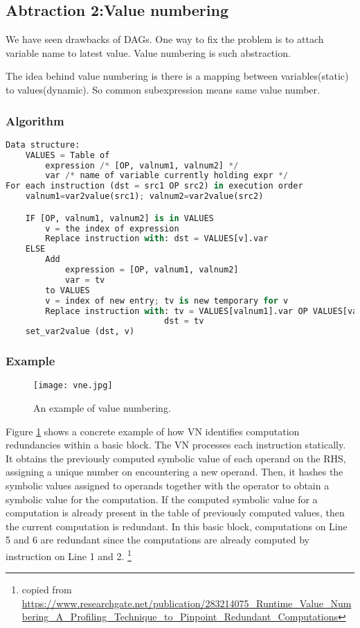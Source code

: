\subsection{Abtraction 2:Value numbering} 

We have seen drawbacks of DAGs. One way to fix the problem is to attach variable name to latest value. Value numbering is 
such abstraction.

The idea behind value numbering is there is a mapping between variables(static) to values(dynamic). So common subexpression means same 
value number.

\subsubsection{Algorithm}


\begin{lstlisting}[language=python, frame=single,caption=code ,label=lst:vna]
Data structure:
    VALUES = Table of
        expression /* [OP, valnum1, valnum2] */
        var /* name of variable currently holding expr */
For each instruction (dst = src1 OP src2) in execution order
    valnum1=var2value(src1); valnum2=var2value(src2)

    IF [OP, valnum1, valnum2] is in VALUES
        v = the index of expression
        Replace instruction with: dst = VALUES[v].var
    ELSE
        Add
            expression = [OP, valnum1, valnum2]
            var = tv
        to VALUES
        v = index of new entry; tv is new temporary for v
        Replace instruction with: tv = VALUES[valnum1].var OP VALUES[valnum2].var
                                dst = tv
    set_var2value (dst, v)  
\end{lstlisting}


\subsubsection{Example}


\begin{figure}[h]
    \centering
    \texttt{[image: vne.jpg]}
    \caption{An example of value numbering.}
    \label{fig:vne}
\end{figure}

Figure \ref{fig:vne} shows a concrete example of how VN identifies
computation redundancies within a basic block. The VN
processes each instruction statically. It obtains the previously
computed symbolic value of each operand on the RHS, assigning a unique number on encountering a new operand. Then, it
hashes the symbolic values assigned to operands together with
the operator to obtain a symbolic value for the computation.
If the computed symbolic value for a computation is already
present in the table of previously computed values, then the
current computation is redundant. In this basic block, computations on Line 5 and 6 are redundant since the computations
are already computed by instruction on Line 1 and 2. \footnote{copied from \url{https://www.researchgate.net/publication/283214075_Runtime_Value_Numbering_A_Profiling_Technique_to_Pinpoint_Redundant_Computations}}



